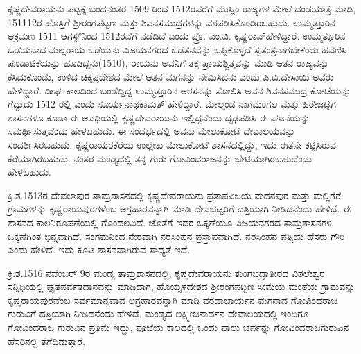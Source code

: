 ಕೃಷ್ಣದೇವರಾಯನು ಪಟ್ಟಕ್ಕೆ ಬಂದನಂತರ 1509 ರಿಂದ 1512ರವರೆಗೆ ಮುಸ್ಲಿಂ ರಾಜ್ಯಗಳ ಮೇಲೆ ದಂಡಯಾತ್ರೆ ಮಾಡಿ, 1511\enginline{-}12ರ ಹೊತ್ತಿಗೆ ಶ‍್ರೀರಂಗಪಟ್ಟಣ ಮತ್ತು ಶಿವನಸಮುದ್ರಗಳನ್ನು ವಶಪಡಿಸಿಕೊಂಡಿರಬಹುದು. ಉಮ್ಮತ್ತೂರಿನ ಆಕ್ರಮಣ 1511 ಆಗಸ್ಟ್​ನಿಂದ 1512ರವೆಗೆ ನಡೆದಿದೆ ಎಂದು ಪ್ರೊ. ಎಂ.ವಿ. ಕೃಷ್ಣರಾವ್​ ಹೇಳಿದ್ದಾರೆ. ಉಮ್ಮತ್ತೂರಿನ ಒಡೆಯನಾದ ಮಲ್ಲರಾಯ ಒಡೆಯನು ವಿಜಯನಗರದ ಒಡೆತನವನ್ನು ಒಪ್ಪಿಕೊಳ್ಳದೆ ಸ್ವತಂತ್ರನಾಗಬೇಕೆಂದು ಹವಣಿಸಿ ಪುಂಡಾಟಿಕೆಯನ್ನು ಹೂಡಿದ್ದನು(1510), ರಾಯನು ಅವನಿಗೆ ತಕ್ಕ ಪ್ರಾಯಶ್ಚಿತ್ತವನ್ನು ಮಾಡಿ ಆತನ ರಾಜ್ಯವನ್ನು ಕಸಿದು\-ಕೊಂಡು, ಉಳಿದ ಚಿಕ್ಕಪ್ರದೇಶದ ಮೇಲೆ ಆತನ ಮಗನನ್ನು ನೇಮಿಸಿದನು ಎಂದು ಪಿ.ಬಿ.ದೇಸಾಯಿ ಅವರು ಹೇಳಿದ್ದಾರೆ. ದೀರ್ಘಕಾಲದಿಂದ ಬಂಡೆದ್ದಿದ್ದ ಉಮ್ಮತ್ತೂರಿನ ಅರಸನನ್ನು ಸೋಲಿಸಿ ಅವನ ಶಿವನಸಮುದ್ರ ಕೋಟೆಯನ್ನು ಗೆದ್ದುದು 1512 ರಲ್ಲಿ ಎಂದು ಸೂರ್ಯನಾಥಕಾಮತ್​ ಹೇಳಿದ್ದಾರೆ. ಮೇಲ್ಕಂಡ ನಾಗಮಂಗಲ ಮತ್ತು ಹಿರೇಜಟ್ಟಿಗ ಶಾಸನಗಳೂ ಕೂಡಾ ಈ ಅವಧಿಯಲ್ಲಿ ಕೃಷ್ಣದೇವರಾಯನು ಇಲ್ಲಿದ್ದನೆಂದು ದೃಢಪಡಿಸಿ ಈ ಘಟನೆಯನ್ನು ಸಮರ್ಥಿಸುತ್ತವೆಂದು ಹೇಳಬಹುದು. ಈ ಸಂದರ್ಭದಲ್ಲಿ ಅವನು ಮೇಲುಕೋಟೆ ದೇವಾಲಯವನ್ನು ಸಂದರ್ಶಿಸಿರಬಹುದು. ಕೃಷ್ಣರಾಯರಕೆರೆಯ ಉಲ್ಲೇಖ ಮೇಲುಕೋಟೆ ಶಾಸನದಲ್ಲಿದ್ದು, ಇದು ಈತನೇ ಕಟ್ಟಿಸಿರುವ ಕೆರೆಯಾಗಿರಬಹುದು. ನಂತರ ಮಂಡ್ಯದಲ್ಲಿ ತನ್ನ ಗುರು ಗೋವಿಂದರಾಜನನ್ನು ಭೇಟಿಯಾಗಿರಬಹುದೆಂದು ಹೇಳಬಹುದು.

ಕ್ರಿ.ಶ.1513ರ ದೇವಲಾಪುರ ತಾಮ್ರಶಾಸನದಲ್ಲಿ ಕೃಷ್ಣದೇವರಾಯನು ಪ್ರತಾಪವಿಜಯ ಮದನಪುರ ಮತ್ತು ಮಲ್ಲಿಗೆರೆ ಗ್ರಾಮಗಳನ್ನು ಕೃಷ್ಣರಾಯಪುರಗಳೆಂಬ ಅಗ್ರಹಾರವನ್ನಾಗಿ ಮಾಡಿ ದೇವಭಟ್ಟರಿಗೆ ದತ್ತಿಯಾಗಿ ನೀಡಿದನೆಂದು ಹೇಳಿದೆ. ಈ ಶಾಸನದ ಕಾಲನಿರೂಪಣೆಯಲ್ಲಿ ಗೊಂದಲವಿದೆ. ಜೊತೆಗೆ ಇದರ ಒಕ್ಕಣೆಯೂ ವಿಜಯನಗರದ ತಾಮ್ರಶಾಸನಗಳ ಒಕ್ಕಣೆಗಿಂತ ಭಿನ್ನವಾಗಿದೆ. ಸಂಗಮನಿಂದ ನೇರವಾಗಿ ನರಸಿಂಹನ ಪ್ರಸ್ತಾಪವಾಗಿದೆ. ನರಸಿಂಹನ ಪತ್ನಿಯ ಹೆಸರು ಗೌರಿ ಎಂದು ಹೇಳಿದೆ. ಇದು ಕೂಟ ಶಾಸನವಾಗಿರುವ ಸಾಧ್ಯತೆ ಇದೆ.

ಕ್ರಿ.ಶ.1516 ನವೆಂಬರ್​ 9ರ ಮಂಡ್ಯ ತಾಮ್ರಶಾಸನದಲ್ಲಿ, ಕೃಷ್ಣದೇವರಾಯನು ತುಂಗಭದ್ರಾತೀರದ ವಿಠಲೇಶ್ವರ ಸನ್ನಿಧಿಯಲ್ಲಿ ಘೃತಪರ್ವತದಾನವನ್ನು ಮಾಡಿದಾಗ, ಹೊಯ್ಸಳದೇಶದ ಶ‍್ರೀರಂಗಪಟ್ಟಣ ಸೀಮೆಯ ಮಂಠೆಯ ಗ್ರಾಮವನ್ನು ಕೃಷ್ಣರಾಯಪುರವೆಂಬ ಸರ್ವಮಾನ್ಯವಾದ ಅಗ್ರಹಾರವನ್ನಾಗಿ ಮಾಡಿ ವರದಾಚಾರ್ಯನ ಮಗನಾದ ಗೋವಿಂದರಾಜ ಗುರುವಿಗೆ ದತ್ತಿಯಾಗಿ ನೀಡಿದನೆಂದು ಹೇಳಿದೆ. ಮಂಡ್ಯದ ಲಕ್ಷ್ಮೀಜನಾರ್ದನ ದೇವಾಲಯದಲ್ಲಿ ಇಂದಿಗೂ ಗೋವಿಂದರಾಜ ಗುರುವಿನ ಪ್ರತಿಮೆ ಇದ್ದು, ಪೂಜೆಯ ಕಾಲದಲ್ಲಿ ಒಂದು ಪಾಲು ಚರ್ಪನ್ನು ಗೋವಿಂದರಾಜಗುರುವಿನ ಹೆಸರಿನಲ್ಲಿ ತೆಗೆದಿಡುತ್ತಾರೆ.

